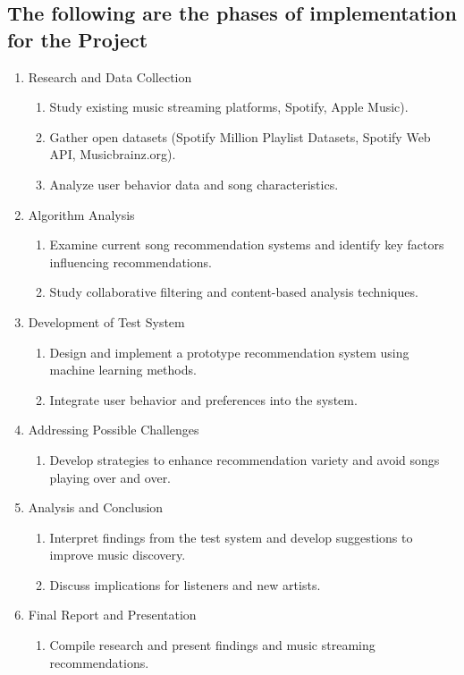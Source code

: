 \documentclass[runningheads]{llncs}
\begin{document}
\subsection{The following are the phases of implementation for the Project}
\begin{enumerate}
\item Research and Data Collection
    \begin{enumerate}
        \item Study existing music streaming platforms, Spotify, Apple Music).
        \item Gather open datasets (Spotify Million Playlist Datasets, Spotify Web API, Musicbrainz.org).
        \item Analyze user behavior data and song characteristics.
    \end{enumerate}
\item Algorithm Analysis
    \begin{enumerate}
        \item Examine current song recommendation systems and identify key factors influencing recommendations. 
        \item Study collaborative filtering and content-based analysis techniques. 
    \end{enumerate}
\item Development of Test System
    \begin{enumerate}
        \item Design and implement a prototype recommendation system using machine learning methods. 
        \item Integrate user behavior and preferences into the system. 
    \end{enumerate}
\item Addressing Possible Challenges
    \begin{enumerate}
        \item Develop strategies to enhance recommendation variety and avoid songs playing over and over. 
    \end{enumerate}
\item Analysis and Conclusion
    \begin{enumerate}
        \item Interpret findings from the test system and develop suggestions to improve music discovery.
        \item Discuss implications for listeners and new artists. 
    \end{enumerate}
\item Final Report and Presentation
    \begin{enumerate}
        \item Compile research and present findings and music streaming recommendations.
    \end{enumerate}
\end{enumerate}
\end{document}
